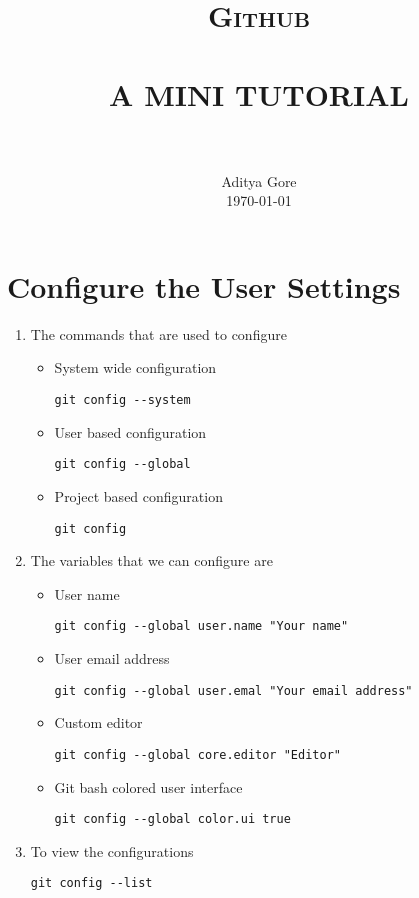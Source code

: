 \documentclass[paper=a4, fontsize=12pt]{scrartcl}
\title{
		\vspace{-1in} 	
		\usefont{OT1}{bch}{b}{n}
		\normalfont \normalsize \textsc{Github} \\ [25pt]
		\horrule{0.5pt} \\[0.4cm]
		\Large A MINI TUTORIAL \\
		\horrule{2pt} \\[0.5cm]
}
\author{
		\normalfont 								\normalsize
        Aditya Gore\\[-3pt]		\normalsize
        \today
}
\date{}
\begin{document}
\maketitle



\lstset{style=git}

\section*{Configure the User Settings}
\begin{enumerate}
\item The commands that are used to configure
\begin{itemize}
\item System wide configuration
\begin{lstlisting}
git config --system
\end{lstlisting}
\item User based configuration
\begin{lstlisting}
git config --global
\end{lstlisting}
\item Project based configuration
\begin{lstlisting}
git config
\end{lstlisting}
\end{itemize}
\item The variables that we can configure are
\begin{itemize}
\item User name
\begin{lstlisting}
git config --global user.name "Your name"
\end{lstlisting}
\item User email address
\begin{lstlisting}
git config --global user.emal "Your email address"
\end{lstlisting}
\item Custom editor
\begin{lstlisting}
git config --global core.editor "Editor"
\end{lstlisting}
\item Git bash colored user interface
\begin{lstlisting}
git config --global color.ui true
\end{lstlisting}
\end{itemize}
\item To view the configurations
\begin{lstlisting}
git config --list
\end{lstlisting}
\end{enumerate}
\end{document}
